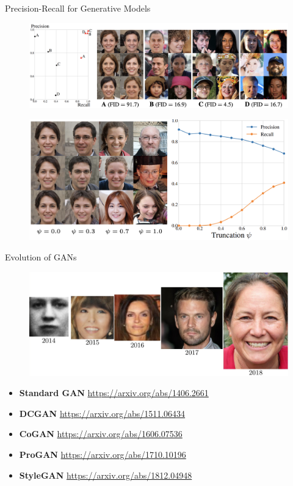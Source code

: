\begin{frame}{Precision-Recall for Generative Models}
	\begin{figure}
		\includegraphics[width=\linewidth]{figs/pr_vs_fid}
	\end{figure}
	\begin{figure}
		\includegraphics[width=0.75\linewidth]{figs/pr_truncation}
	\end{figure}
\end{frame}
\begin{frame}{Evolution of GANs}
	\begin{figure}
		\centering
		\includegraphics[width=\linewidth]{figs/gan_evolution}
	\end{figure}
	\begin{itemize}
		\item \textbf{Standard GAN} \href{https://arxiv.org/abs/1406.2661}{https://arxiv.org/abs/1406.2661}
		\item \textbf{DCGAN} \href{https://arxiv.org/abs/1511.06434}{https://arxiv.org/abs/1511.06434}
		\item \textbf{CoGAN} \href{https://arxiv.org/abs/1606.07536}{https://arxiv.org/abs/1606.07536}
		\item \textbf{ProGAN} \href{https://arxiv.org/abs/1710.10196}{https://arxiv.org/abs/1710.10196} 
		\item \textbf{StyleGAN} \href{https://arxiv.org/abs/1812.04948}{https://arxiv.org/abs/1812.04948}
	\end{itemize}
\end{frame}
